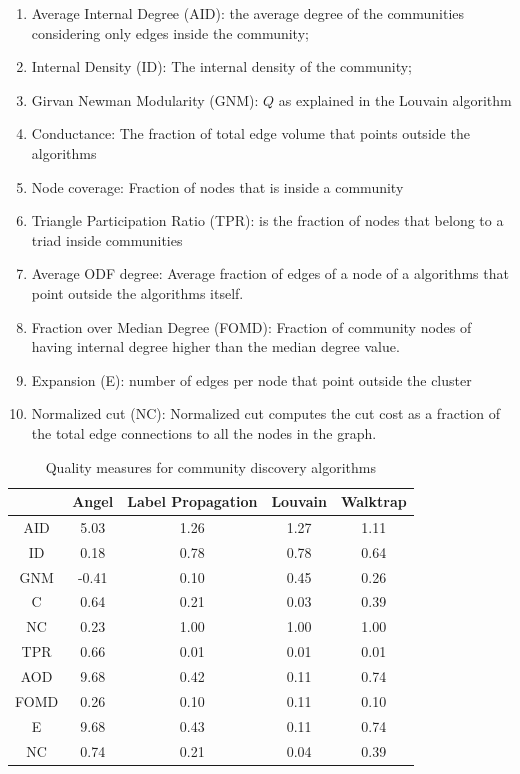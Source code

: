 \documentclass[sigchi]{acmart}
\begin{document}
\begin{enumerate}
    \item Average Internal Degree (AID): the average degree of the communities considering only edges inside the community;
    \item Internal Density (ID): The internal density of the community;
    \item Girvan Newman Modularity (GNM): $Q$ as explained in the Louvain algorithm
    \item Conductance: The fraction of total edge volume that points outside the algorithms
    \item Node coverage: Fraction of nodes that is inside a community
    \item Triangle Participation Ratio (TPR): is the fraction of nodes that belong to a triad inside communities
    \item Average ODF degree: Average fraction of edges of a node of a algorithms that point outside the algorithms itself.
    \item Fraction over Median Degree (FOMD): Fraction of community nodes of having internal degree higher than the median degree value.
    \item Expansion (E): number of edges per node that point outside the cluster
    \item Normalized cut (NC): Normalized cut computes the cut cost as a fraction of the total edge connections to all the nodes in the graph.
    \end{enumerate}

\begin{table}
  \caption{Quality measures for community discovery algorithms}
  \label{tab:freq}
  \begin{tabular}{c|cccc}
    \toprule
     & Angel & Label Propagation & Louvain & Walktrap \\
    \midrule
    AID & 5.03 & 1.26 & 1.27 & 1.11\\
    ID & 0.18 & 0.78 & 0.78 & 0.64\\
    GNM & -0.41 & 0.10 & 0.45 & 0.26\\
    C & 0.64 & 0.21& 0.03 & 0.39\\
    NC & 0.23 & 1.00 & 1.00 & 1.00\\
    TPR & 0.66 & 0.01 & 0.01 & 0.01\\
    AOD & 9.68 & 0.42& 0.11 & 0.74\\
    FOMD & 0.26 & 0.10 & 0.11 & 0.10\\
    E & 9.68 & 0.43& 0.11 & 0.74\\
    NC & 0.74 & 0.21 & 0.04 & 0.39\\
  \bottomrule
\end{tabular}
\end{table}
\end{document}
